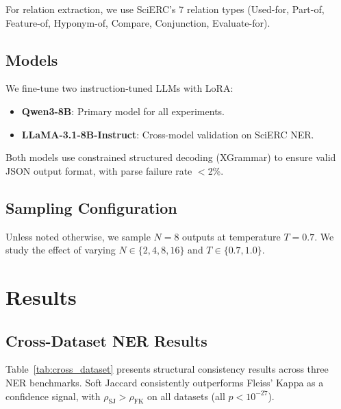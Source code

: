 \documentclass[11pt,a4paper]{article}
\newcommand{\rhosj}{\rho_{\mathrm{SJ}}}
\newcommand{\rhofk}{\rho_{\mathrm{FK}}}
\begin{document}
For relation extraction, we use SciERC's 7 relation types (Used-for, Part-of, Feature-of, Hyponym-of, Compare, Conjunction, Evaluate-for).

\subsection{Models}

We fine-tune two instruction-tuned LLMs with LoRA:
\begin{itemize}
    \item \textbf{Qwen3-8B}: Primary model for all experiments.
    \item \textbf{LLaMA-3.1-8B-Instruct}: Cross-model validation on SciERC NER.
\end{itemize}

Both models use constrained structured decoding (XGrammar) to ensure valid JSON output format, with parse failure rate $<$2\%.

\subsection{Sampling Configuration}

Unless noted otherwise, we sample $N\!=\!8$ outputs at temperature $T\!=\!0.7$. We study the effect of varying $N \in \{2,4,8,16\}$ and $T \in \{0.7, 1.0\}$.

\section{Results}

\subsection{Cross-Dataset NER Results}

Table~\ref{tab:cross_dataset} presents structural consistency results across three NER benchmarks. Soft Jaccard consistently outperforms Fleiss' Kappa as a confidence signal, with $\rhosj > \rhofk$ on all datasets (all $p < 10^{-27}$).
\end{document}
